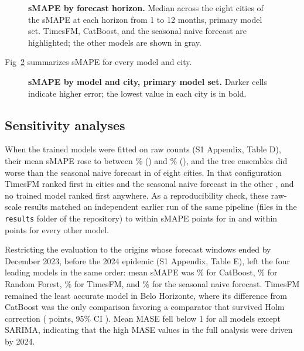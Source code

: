 \documentclass[10pt,letterpaper]{article}
\begin{document}
\begin{figure}[!h]
\caption{\textbf{sMAPE by forecast horizon.}
Median across the eight cities of the sMAPE at each horizon from 1 to 12 months, primary model set. TimesFM, CatBoost, and the seasonal naive forecast are highlighted; the other models are shown in gray.}
\label{fig3}
\end{figure}

Fig~\ref{fig4} summarizes sMAPE for every model and city.

\begin{figure}[!h]
\caption{\textbf{sMAPE by model and city, primary model set.}
Darker cells indicate higher error; the lowest value in each city is in bold.}
\label{fig4}
\end{figure}

\subsection*{Sensitivity analyses}
When the trained models were fitted on raw counts (S1 Appendix, Table D), their mean sMAPE rose to between \% () and \% (), and the tree ensembles did worse than the seasonal naive forecast in  of eight cities. In that configuration TimesFM ranked first in  cities and the seasonal naive forecast in the other , and no trained model ranked first anywhere. As a reproducibility check, these raw-scale results matched an independent earlier run of the same pipeline (files in the \texttt{results} folder of the repository) to within  sMAPE points for  in  and within  points for every other model.

Restricting the evaluation to the  origins whose forecast windows ended by December 2023, before the 2024 epidemic (S1 Appendix, Table E), left the four leading models in the same order: mean sMAPE was \% for CatBoost, \% for Random Forest, \% for TimesFM, and \% for the seasonal naive forecast. TimesFM remained the least accurate model in Belo Horizonte, where its difference from CatBoost was the only comparison favoring a comparator that survived Holm correction ( points, 95\% CI ). Mean MASE fell below 1 for all models except SARIMA, indicating that the high MASE values in the full analysis were driven by 2024.
\end{document}
